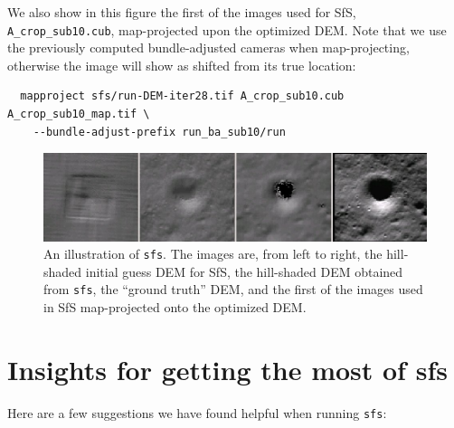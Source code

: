 We also show in this figure the first of the images used for SfS,
\verb#A_crop_sub10.cub#, map-projected upon the optimized DEM. Note that
we use the previously computed bundle-adjusted cameras when
map-projecting, otherwise the image will show as shifted from its true
location:
\begin{verbatim}
  mapproject sfs/run-DEM-iter28.tif A_crop_sub10.cub A_crop_sub10_map.tif \
    --bundle-adjust-prefix run_ba_sub10/run
\end{verbatim}
\begin{figure}[h!]
\begin{center}
\includegraphics[width=7in]{images/sfs2.jpg}
\caption[sfs]{An illustration of \texttt{sfs}. The images are, from
  left to right, the hill-shaded initial guess DEM for SfS, the hill-shaded DEM obtained
from \texttt{sfs}, the ``ground truth'' DEM, and the first of the
images used in SfS map-projected onto the optimized DEM.}
\label{fig:sfs2}
\end{center}
\end{figure}

\section{Insights for getting the most of sfs}
\label{sfs:insights}

Here are a few suggestions we have found helpful when running \texttt{sfs}:

